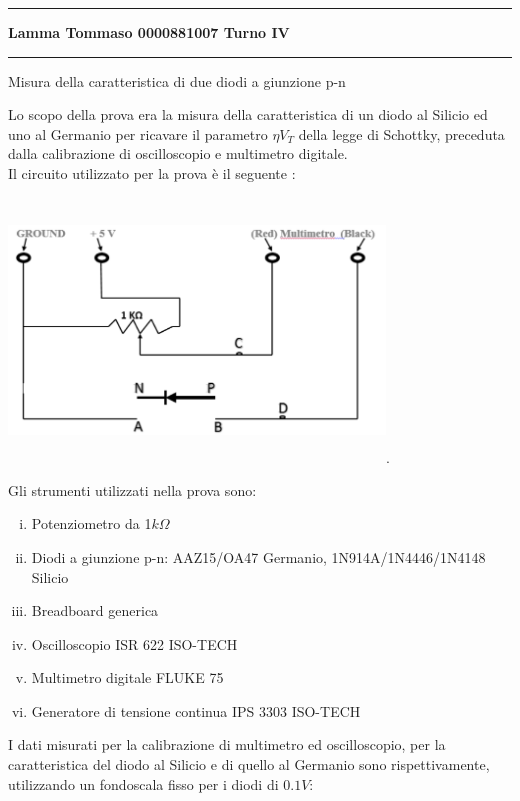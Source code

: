\documentclass{amsart}
\begin{document}
    \hrule
    \begin{center}
        \textbf{ Lamma    Tommaso    0000881007        Turno    IV }
    \end{center}
    \hrule
    \begin{center}
        {\huge Misura della caratteristica di due diodi a giunzione p-n}
    \end{center}
    Lo scopo della prova era la misura della caratteristica di un diodo al Silicio ed uno al Germanio
    per ricavare il parametro $\eta V_T$ della legge di Schottky, preceduta dalla calibrazione di oscilloscopio e 
    multimetro digitale.\\
    Il circuito utilizzato per la prova è il seguente :
    \begin{center}
        \includegraphics[width = 10cm, height = 7cm]{circuito.png}.
    \end{center}
    Gli strumenti utilizzati nella prova sono:
    \begin{enumerate}[(i)]
        \item Potenziometro da 1$k\Omega$
        \item Diodi a giunzione p-n: AAZ15/OA47 Germanio, 1N914A/1N4446/1N4148 Silicio
        \item Breadboard generica
        \item Oscilloscopio ISR 622 ISO-TECH
        \item Multimetro digitale FLUKE 75
        \item Generatore di tensione continua IPS 3303 ISO-TECH
    \end{enumerate}
    I dati misurati per la calibrazione di multimetro ed oscilloscopio, per la caratteristica del diodo al Silicio 
    e di quello al Germanio sono rispettivamente, utilizzando un fondoscala fisso per i diodi di $0.1V$:\\
    \hfill \\
\end{document}
